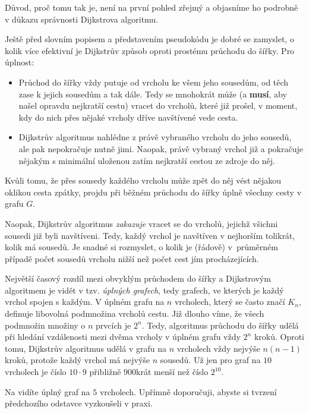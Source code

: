 Důvod, proč tomu tak je, není na první pohled zřejmý a objasníme ho podrobně v
důkazu správnosti Dijkstrova algoritmu.

Ještě před slovním popisem a představením pseudokódu je dobré se zamyslet, o
kolik více efektivní je Dijkstrův způsob oproti prostému průchodu do šířky. Pro
úplnost:
\begin{itemize}
 \item Průchod do šířky vždy putuje od vrcholu ke všem jeho sousedům, od těch
  zase k jejich sousedům a tak dále. Tedy se mnohokrát může (a \textbf{musí},
  aby našel opravdu nejkratší cestu) vracet do vrcholů, které již prošel, v
  moment, kdy do nich přes nějaké vrcholy dříve navštívené vede cesta.
 \item Dijkstrův algoritmus nahlédne z právě vybraného vrcholu do jeho sousedů,
  ale pak nepokračuje nutně jimi. Naopak, právě vybraný vrchol již 
  a pokračuje nějakým s minimální uloženou zatím nejkratší cestou ze zdroje do
  něj.
\end{itemize}
Kvůli tomu, že přes sousedy každého vrcholu může zpět do něj vést nějakou
oklikou cesta zpátky, projdu při běžném průchodu do šířky úplně všechny cesty v
grafu $G$.

Naopak, Dijkstrův algoritmus \emph{zakazuje} vracet se do vrcholů, jejichž
všichni sousedi již byli navštíveni. Tedy, každý vrchol je navštíven v nejhorším
tolikrát, kolik má sousedů. Je snadné si rozmyslet, o kolik je (řádově)
v~průměrném případě počet sousedů vrcholu nižší než počet cest jím
procházejících.

Největší časový rozdíl mezi obvyklým průchodem do šířky a Dijkstrovým algoritmem
je vidět v tzv. \emph{úplných grafech}, tedy grafech, ve kterých je každý vrchol
spojen s každým. V úplném grafu na $n$ vrcholech, který se často značí $K_n$,
definuje libovolná podmnožina vrcholů cestu. Již dlouho víme, že všech podmnožin
množiny o $n$ prvcích je $2^{n}$. Tedy, algoritmus průchodu do šířky udělá při
hledání vzdálenosti mezi dvěma vrcholy v úplném grafu vždy $2^{n}$ kroků. Oproti
tomu, Dijkstrův algoritmus udělá v grafu na $n$ vrcholech vždy nejvýše $n(n-1)$
kroků, protože každý vrchol má nejvýše $n$ sousedů. Už jen pro graf na $10$
vrcholech je číslo $10 \cdot 9$ přibližně $900$krát menší než číslo $2^{10}$.

Na  vidíte úplný graf na $5$ vrcholech. Upřímně
doporučuji, abyste si tvrzení předchozího odstavce vyzkoušeli v praxi.

